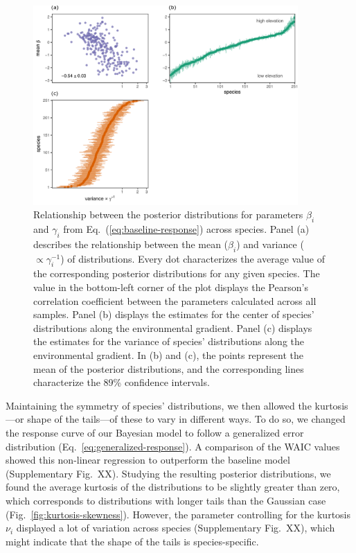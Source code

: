 \documentclass[11pt, a4paper]{article}
\begin{document}
\begin{figure}[h]
  \centering
    \includegraphics[width=0.9\textwidth]{figures/figure1-prime}
    	  \vspace{0.1cm}
	   \caption{Relationship between the posterior distributions for parameters $\beta_i$ and $\gamma_i$ from Eq.~(\ref{eq:baseline-response}) across species. Panel (a) describes the relationship between the mean ($\beta_i$) and variance ($\propto\gamma_i^{-1}$) of distributions. Every dot characterizes the average value of the corresponding posterior distributions for any given species. The value in the bottom-left corner of the plot displays the Pearson's correlation coefficient between the parameters calculated across all samples. Panel (b) displays the estimates for the center of species' distributions along the environmental gradient. Panel (c) displays the estimates for the variance of species' distributions along the environmental gradient. In (b) and (c), the points represent the mean of the posterior distributions, and the corresponding lines characterize the 89\% confidence intervals.}
      \label{fig:correlation}
\end{figure}

Maintaining the symmetry of species' distributions, we then allowed the kurtosis---or shape of the tails---of these to vary in different ways. To do so, we changed the response curve of our Bayesian model to follow a generalized error distribution (Eq.~\ref{eq:generalized-response}). A comparison of the WAIC values showed this non-linear regression to outperform the baseline model (Supplementary Fig.~XX). Studying the resulting posterior distributions, we found the average kurtosis of the distributions to be slightly greater than zero, which corresponds to distributions with longer tails than the Gaussian case (Fig.~\ref{fig:kurtosis-skewness}). However, the parameter controlling for the kurtosis $\nu_i$ displayed a lot of variation across species (Supplementary Fig.~XX), which might indicate that the shape of the tails is species-specific. 
\end{document}
